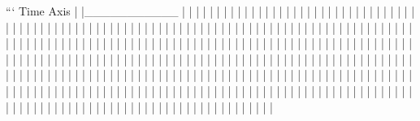```
Time Axis
|
|___________
|           |
|           |
|           |
|           |
|           |
|           |
|           |
|           |
|           |
|           |
|           |
|           |
|           |
|           |
|           |
|           |
|           |
|           |
|           |
|           |
|           |
|           |
|           |
|           |
|           |
|           |
|           |
|           |
|           |
|           |
|           |
|           |
|           |
|           |
|           |
|           |
|           |
|           |
|           |
|           |
|           |
|           |
|           |
|           |
|           |
|           |
|           |
|           |
|           |
|           |
|           |
|           |
|           |
|           |
|           |
|           |
|           |
|           |
|           |
|           |
|           |
|           |
|           |
|           |
|           |
|           |
|           |
|           |
|           |
|           |
|           |
|           |
|           |
|           |
|           |
|           |
|           |
|           |
|           |
|           |
|           |
|           |
|           |
|           |
|           |
|           |
|           |
|           |
|           |
|           |
|           |
|           |
|           |
|           |
|           |
|           |
|           |
|           |
|           |
|           |
|           |
|           |
|           |
|           |
|           |
|           |
|           |
|           |
|           |
|           |
|           |
|           |
|           |
|           |
|           |
|           |
|           |
|           |
|           |
|           |
|           |
|           |
|           |
|           |
|           |
|           |
|           |
|           |
|           |
|           |
|           |
|           |
|           |
|           |
|           |
|           |
|           |
|           |
|           |
|           |
|           |
|           |
|           |
|           |
|           |
|           |
|           |
|           |
|           |
|           |
|           |
|           |
|           |
|           |
|           |
|           |
|           |
|           |
|           |
|           |
|           |
|           |
|           |
|           |
|           |
|           |
|           |
|           |
|           |
|           |
|           |
|           |
|           |
|           |
|           |
|           |
|           |
|           |
|           |
|           |
|           |
|           |
|           |
|           |
